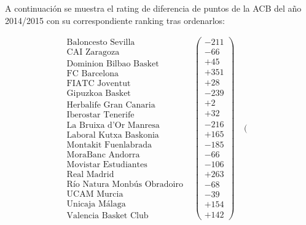 \begin{ejem} A continuación se muestra el rating de diferencia de puntos de la ACB del año 2014/2015 con su correspondiente ranking tras ordenarlos:
\end{ejem}	
	$$\begin{array}{ccc}
	\begin{array}{c}
	\text{Baloncesto Sevilla}\\
	\text{CAI Zaragoza} \\
	\text{Dominion Bilbao Basket} \\
	\text{FC Barcelona} \\
	\text{FIATC Joventut} \\
	\text{Gipuzkoa Basket} \\
	\text{Herbalife Gran Canaria} \\
	\text{Iberostar Tenerife} \\
	\text{La Bruixa d'Or Manresa} \\
	\text{Laboral Kutxa Baskonia} \\
	\text{Montakit Fuenlabrada} \\
	\text{MoraBanc Andorra} \\
	\text{Movistar Estudiantes} \\
	\text{Real Madrid} \\
	\text{Río Natura Monbús Obradoiro} \\
	\text{UCAM Murcia} \\
	\text{Unicaja Málaga} \\
	\text{Valencia Basket Club}	
	\end{array} & \left(\begin{array}{c}
	-211\\
	-66\\
	+45\\
	+351\\
	+28\\
	-239\\
	+2\\
	+32\\
	-216\\
	+165\\
	-185\\
	-66\\
	-106\\
	+263\\
	-68\\
	-39\\
	+154\\
	+142
	\end{array} \right) & \left(\begin{array}{c}

\end{array}
\end{array}$$

